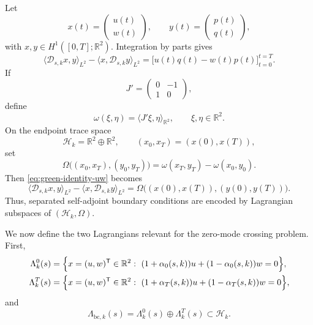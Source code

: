 \documentclass[11pt]{article}
\theoremstyle{definition}
\numberwithin{equation}{section}
\begin{document}
Let
\begin{equation}
x(t)=\begin{pmatrix}u(t)\\ w(t)\end{pmatrix},
\qquad
y(t)=\begin{pmatrix}p(t)\\ q(t)\end{pmatrix},
\end{equation}
with \(x,y\in H^1([0,T];\mathbb R^2)\). Integration by parts gives
\begin{equation}\label{eq:green-identity-uw}
\langle \mathcal D_{s,k}x,y\rangle_{L^2}
-
\langle x,\mathcal D_{s,k}y\rangle_{L^2}
=
\bigl[u(t)q(t)-w(t)p(t)\bigr]_{t=0}^{t=T}.
\end{equation}
If
\begin{equation}
J'=
\begin{pmatrix}
0&-1\\
1&0
\end{pmatrix},
\end{equation}
define
\begin{equation}
\omega(\xi,\eta)=\langle J'\xi,\eta\rangle_{\mathbb R^2},
\qquad
\xi,\eta\in\mathbb R^2.
\end{equation}
On the endpoint trace space
\begin{equation}
\mathcal H_k=\mathbb R^2\oplus\mathbb R^2,
\qquad
(x_0,x_T)=(x(0),x(T)),
\end{equation}
set
\begin{equation}\label{eq:Omega-def-green}
\Omega\big((x_0,x_T),(y_0,y_T)\big)
=
\omega(x_T,y_T)-\omega(x_0,y_0).
\end{equation}
Then \eqref{eq:green-identity-uw} becomes
\begin{equation}\label{eq:green-identity-Omega}
\langle \mathcal D_{s,k}x,y\rangle_{L^2}
-
\langle x,\mathcal D_{s,k}y\rangle_{L^2}
=
\Omega\big((x(0),x(T)),(y(0),y(T))\big).
\end{equation}
Thus, separated self-adjoint boundary conditions are encoded by Lagrangian subspaces of \((\mathcal H_k,\Omega)\).

We now define the two Lagrangians relevant for the zero-mode crossing problem. First,
\begin{subequations}
\begin{align}
\Lambda_k^0(s)
&=
\Bigl\{x=(u,w)^{\mathsf T}\in\mathbb R^2:\ (1+\alpha_0(s,k))u+(1-\alpha_0(s,k))w=0\Bigr\},\\
\Lambda_k^T(s)
&=
\Bigl\{x=(u,w)^{\mathsf T}\in\mathbb R^2:\ (1+\alpha_T(s,k))u+(1-\alpha_T(s,k))w=0\Bigr\},
\end{align}
\end{subequations}
and
\begin{equation}\label{eq:Lambda_bc_clean}
\Lambda_{\mathrm{bc},k}(s)=\Lambda_k^0(s)\oplus\Lambda_k^T(s)\subset\mathcal H_k.
\end{equation}
\end{document}
